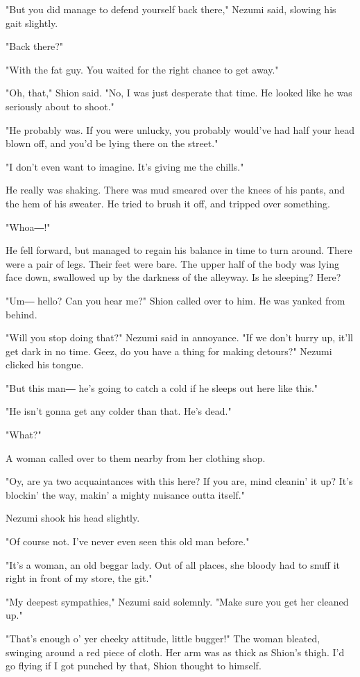 "But you did manage to defend yourself back there," Nezumi said, slowing
his gait slightly.

"Back there?"

"With the fat guy. You waited for the right chance to get away."

"Oh, that," Shion said. "No, I was just desperate that time. He looked
like he was seriously about to shoot."

"He probably was. If you were unlucky, you probably would've had half
your head blown off, and you'd be lying there on the street."

"I don't even want to imagine. It's giving me the chills."

He really was shaking. There was mud smeared over the knees of his
pants, and the hem of his sweater. He tried to brush it off, and tripped
over something.

"Whoa―!"

He fell forward, but managed to regain his balance in time to turn
around. There were a pair of legs. Their feet were bare. The upper half
of the body was lying face down, swallowed up by the darkness of the
alleyway. Is he sleeping? Here?

"Um― hello? Can you hear me?" Shion called over to him. He was yanked
from behind.

"Will you stop doing that?" Nezumi said in annoyance. "If we don't hurry
up, it'll get dark in no time. Geez, do you have a thing for making
detours?" Nezumi clicked his tongue.

"But this man― he's going to catch a cold if he sleeps out here like
this."

"He isn't gonna get any colder than that. He's dead."

"What?"

A woman called over to them nearby from her clothing shop.

"Oy, are ya two acquaintances with this here? If you are, mind cleanin'
it up? It's blockin' the way, makin' a mighty nuisance outta itself."

Nezumi shook his head slightly.

"Of course not. I've never even seen this old man before."

"It's a woman, an old beggar lady. Out of all places, she bloody had to
snuff it right in front of my store, the git."

"My deepest sympathies," Nezumi said solemnly. "Make sure you get her
cleaned up."

"That's enough o' yer cheeky attitude, little bugger!" The woman
bleated, swinging around a red piece of cloth. Her arm was as thick as
Shion's thigh. I'd go flying if I got punched by that, Shion thought to
himself.

